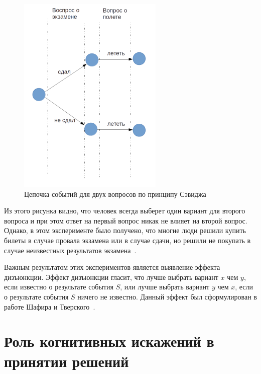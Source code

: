 \begin{figure}[h!]
    \centering
    \captionsetup{justification=centering}
    \includegraphics[width=0.35\linewidth]{pictures/vacation_and_exam_2.png}
    \caption{Цепочка событий для двух вопросов по принципу Сэвиджа}
    \label{fig:vac_exam_savage}
\end{figure}
Из этого рисунка видно, что человек всегда выберет один вариант для второго вопроса и при этом ответ
на первый вопрос никак не влияет на второй вопрос. Однако, в этом эксперименте было получено, что
многие люди решили купить билеты в случае провала экзамена или в случае сдачи, но решили не покупать
в случае неизвестных результатов экзамена~\citep{tversky1992disjunction}.

Важным результатом этих экспериментов является выявление эффекта дизъюнкции. Эффект дизъюнкции гласит,
что лучше выбрать вариант $x$ чем $y$, если известно о результате события $S$, или лучше выбрать
вариант $y$ чем $x$, если о результате события $S$ ничего не известно. Данный эффект был сформулирован
в работе Шафира и Тверского~\citep{shafir199228thinking}.

\section{Роль когнитивных искажений в принятии решений}

